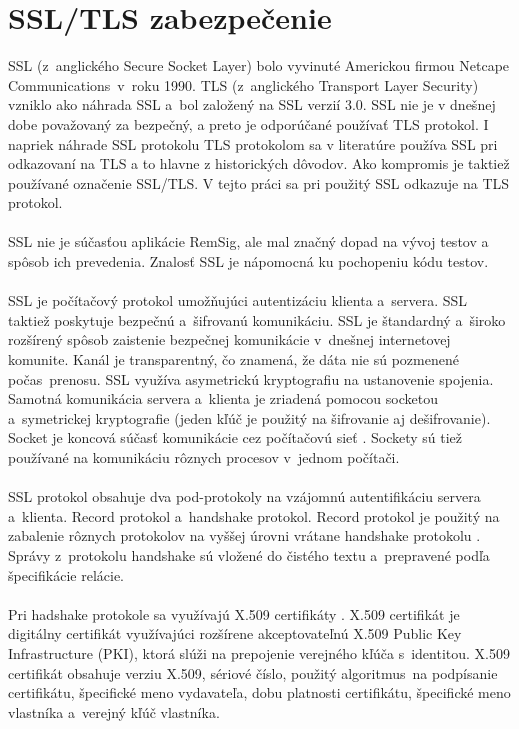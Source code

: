 \documentclass[
  digital, %
  table,   %
oneside,
  nolof,     %
  nolot,     %
]{fithesis3}
\begin{document}
\section{SSL/TLS zabezpečenie}
SSL (z~anglického Secure Socket Layer) bolo vyvinuté Americkou firmou Netcape Communications~v~roku 1990. TLS (z~anglického Transport Layer Security) vzniklo ako náhrada SSL a~bol založený na SSL verzií 3.0. SSL nie je v dnešnej dobe považovaný za bezpečný, a preto je odporúčané používať TLS protokol. I napriek náhrade SSL protokolu TLS protokolom sa v literatúre používa SSL pri odkazovaní na TLS a to hlavne z historických dôvodov. Ako kompromis je taktiež používané označenie SSL/TLS. V tejto práci sa pri použitý SSL odkazuje na TLS protokol. \paragraph{}
SSL nie je súčasťou aplikácie RemSig, ale mal značný dopad na vývoj testov a spôsob ich prevedenia. Znalosť SSL je nápomocná ku pochopeniu kódu testov.
\paragraph{}

SSL je počítačový protokol umožňujúci autentizáciu  klienta a~servera. SSL taktiež  poskytuje  bezpečnú a~šifrovanú komunikáciu.
 SSL je štandardný a~široko rozšírený spôsob zaistenie bezpečnej komunikácie v~dnešnej internetovej komunite. Kanál je transparentný, čo znamená, že dáta nie sú pozmenené počas~prenosu. SSL využíva asymetrickú kryptografiu  na ustanovenie spojenia. Samotná komunikácia servera a~klienta je zriadená pomocou socketou a~symetrickej kryptografie (jeden kľúč je použitý na šifrovanie aj dešifrovanie). Socket je koncová súčasť komunikácie cez počítačovú sieť \cite{networkSocket}. Sockety sú tiež používané na komunikáciu rôznych procesov v~jednom počítači. \paragraph{}
SSL protokol obsahuje dva pod-protokoly na vzájomnú autentifikáciu servera a~klienta. Record protokol a~handshake protokol. Record protokol je použitý na zabalenie rôznych protokolov na vyššej úrovni vrátane handshake protokolu \cite{ssl3.0}. Správy z~protokolu handshake  sú vložené do čistého textu a~prepravené podľa špecifikácie relácie. \paragraph{}
Pri hadshake protokole sa využívajú X.509 certifikáty \cite{x509cert}. X.509 certifikát je digitálny certifikát využívajúci rozšírene akceptovateľnú X.509 Public Key Infrastructure (PKI), ktorá slúži na prepojenie verejného kľúča s~identitou.  X.509 certifikát obsahuje verziu X.509, sériové číslo, použitý algoritmus~na podpísanie certifikátu, špecifické meno vydavateľa, dobu platnosti certifikátu, špecifické meno vlastníka a~verejný kľúč vlastníka.  
\end{document}
